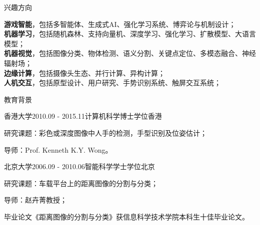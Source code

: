 \documentclass[UTF8]{cv_professional-cn} %
\begin{document}

\begin{rSection}{兴趣方向}

{\bf 游戏智能}，包括多智能体、生成式AI、强化学习系统、博弈论与机制设计；\\
{\bf 机器学习}，包括随机森林、支持向量机、深度学习、强化学习、扩散模型、大语言模型； \\
{\bf 机器视觉}，包括图像分类、物体检测、语义分割、关键点定位、多模态融合、神经辐射场；\\
{\bf 边缘计算}，包括摄像头生态、并行计算、异构计算；\\
{\bf 人机交互}，包括原型设计、用户研究、手势识别系统、触屏交互系统； 

\end{rSection}


\begin{rSection}{教育背景}

\begin{rSubsection}{香港大学}{2010.09 - 2015.11}{计算机科学博士学位}{香港}
	\item 研究课题：彩色或深度图像中人手的检测，手型识别及位姿估计；
	\item 导师：Prof. Kenneth K.Y. Wong。
\end{rSubsection}

\begin{rSubsection}{北京大学}{2006.09 - 2010.06}{智能科学学士学位}{北京}
	\item 研究课题：车载平台上的距离图像的分割与分类；
	\item 导师：赵卉菁教授；
	\item 毕业论文《距离图像的分割与分类》获信息科学技术学院本科生十佳毕业论文。
\end{rSubsection}
\end{rSection}

\end{document}
